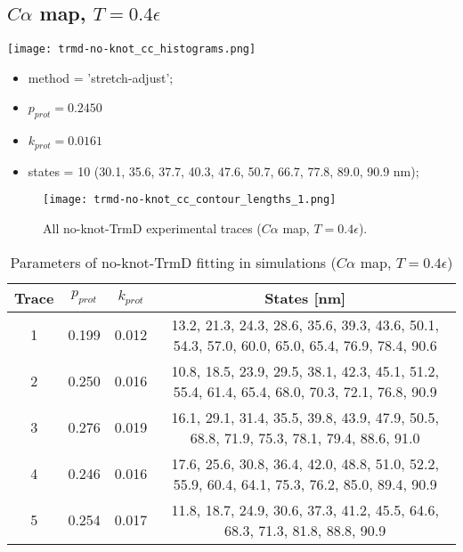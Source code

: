 \subsection{$C\alpha$ map, $T=0.4\epsilon$}
\label{subsec:no-knot-trmd-cc}
\begin{minipage}[c]{0.7\textwidth}
    \texttt{[image: trmd-no-knot\_cc\_histograms.png]}
\end{minipage}
\hfill
\begin{minipage}[c]{0.45\textwidth}
    \begin{itemize}
        \item method = 'stretch-adjust';
        \item $p_{prot}=0.2450$
        \item $k_{prot}=0.0161$
        \item states = 10 (30.1, 35.6, 37.7, 40.3, 47.6, 50.7, 66.7, 77.8, 89.0, 90.9 nm);
    \end{itemize}
\end{minipage}

\begin{figure}
    \centering
    \texttt{[image: trmd-no-knot\_cc\_contour\_lengths\_1.png]}
    \caption{All no-knot-TrmD experimental traces ($C\alpha$ map, $T=0.4\epsilon$).}
    \label{fig:no-knot-trmd-cc-cl1}
\end{figure}

\begin{table}
    \tiny
    \centering
    \caption{Parameters of no-knot-TrmD fitting in simulations ($C\alpha$ map, $T=0.4\epsilon$)}
    \label{tab:no-knot-trmd-cc-parameters}
    \begin{tabular}{c|c|c|c}
        \textbf{Trace} & \textbf{$p_{prot}$} & \textbf{$k_{prot}$} & \textbf{States [nm]}\\\hline
        1 & 0.199 & 0.012 & 13.2, 21.3, 24.3, 28.6, 35.6, 39.3, 43.6, 50.1, 54.3, 57.0, 60.0, 65.0, 65.4, 76.9, 78.4, 90.6\\
        2 & 0.250 & 0.016 & 10.8, 18.5, 23.9, 29.5, 38.1, 42.3, 45.1, 51.2, 55.4, 61.4, 65.4, 68.0, 70.3, 72.1, 76.8, 90.9\\
        3 & 0.276 & 0.019 & 16.1, 29.1, 31.4, 35.5, 39.8, 43.9, 47.9, 50.5, 68.8, 71.9, 75.3, 78.1, 79.4, 88.6, 91.0\\
        4 & 0.246 & 0.016 & 17.6, 25.6, 30.8, 36.4, 42.0, 48.8, 51.0, 52.2, 55.9, 60.4, 64.1, 75.3, 76.2, 85.0, 89.4, 90.9\\
        5 & 0.254 & 0.017 & 11.8, 18.7, 24.9, 30.6, 37.3, 41.2, 45.5, 64.6, 68.3, 71.3, 81.8, 88.8, 90.9\\
    \end{tabular}
\end{table}

